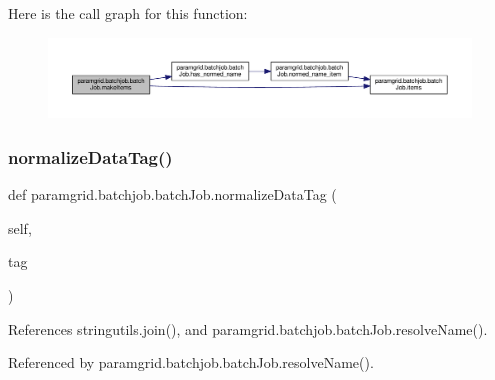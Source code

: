 Here is the call graph for this function\+:
\nopagebreak
\begin{figure}[H]
\begin{center}
\leavevmode
\includegraphics[width=350pt]{classparamgrid_1_1batchjob_1_1batchJob_a6285bac486b704b012f454c29ab88595_cgraph}
\end{center}
\end{figure}
\mbox{\label{classparamgrid_1_1batchjob_1_1batchJob_ac738cf079fd0567111d2ce1e591ff2f5}} 
\subsubsection{\texorpdfstring{normalize\+Data\+Tag()}{normalizeDataTag()}}
{\footnotesize\ttfamily def paramgrid.\+batchjob.\+batch\+Job.\+normalize\+Data\+Tag (\begin{DoxyParamCaption}\item[{}]{self,  }\item[{}]{tag }\end{DoxyParamCaption})}



References stringutils.\+join(), and paramgrid.\+batchjob.\+batch\+Job.\+resolve\+Name().



Referenced by paramgrid.\+batchjob.\+batch\+Job.\+resolve\+Name().

